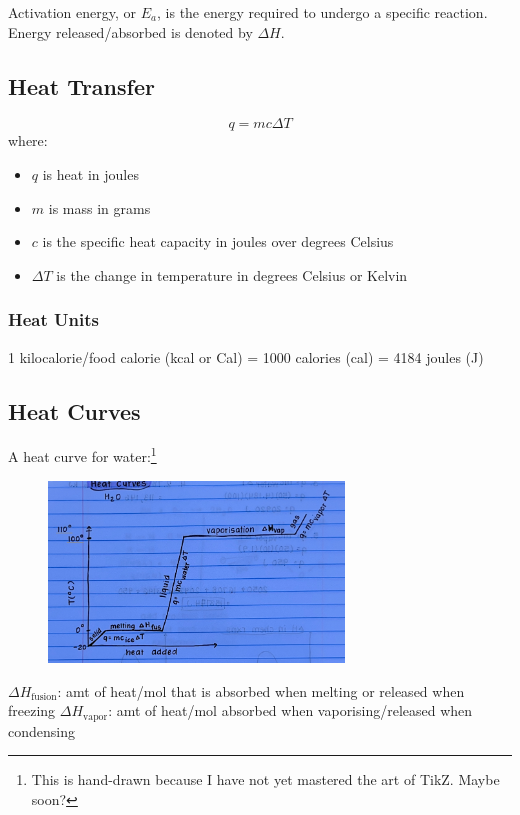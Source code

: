 \documentclass[a4paper, 12pt]{article}
\begin{document}
Activation energy, or \(E_a\), is the energy required to undergo a specific reaction. Energy released/absorbed is denoted by \(\Delta H\).

\subsection{Heat Transfer}

\begin{equation}\label{heattransfer}
q = mc \Delta T
\end{equation}
where:
\begin{itemize}[leftmargin=*, nosep]
\item $q$ is heat in joules
\item $m$ is mass in grams
\item $c$ is the specific heat capacity in joules over degrees Celsius
\item $\Delta T$ is the change in temperature in degrees Celsius or Kelvin
\end{itemize}

\subsubsection{Heat Units}

1 kilocalorie/food calorie (kcal or Cal) = 1000 calories (cal) = 4184 joules (J)

\subsection{Heat Curves}
A heat curve for water:\footnote{This is hand-drawn because I have not yet mastered the art of TikZ. Maybe soon?}

\begin{figure}[H]
\centering
\includegraphics[width=0.7\textwidth]{heatcurve.jpg}
\end{figure}

$\Delta H_\text{fusion}$: amt of heat/mol that is absorbed when melting or released when freezing
$\Delta H_\text{vapor}$: amt of heat/mol absorbed when vaporising/released when condensing
\end{document}
